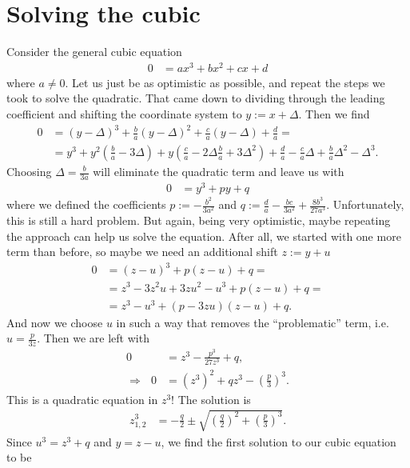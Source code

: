 \documentclass[english, parskip=full]{scrartcl}
\newcommand{\kla}{}
\begin{document}
\section{Solving the cubic}
Consider the general cubic equation
\begin{align}
0 &= ax^3+bx^2+cx+d
\end{align}
where $a\neq 0$.
Let us just be as optimistic as possible, and repeat the steps we took to solve the quadratic.
That came down to dividing through the leading coefficient and shifting the coordinate system to $y:=x+\Delta$.
Then we find
\begin{align}
0 &= \kla\left( y-\Delta \right)^3 + \frac{b}{a} \kla\left( y-\Delta \right)^2 + \frac{c}{a}\kla\left( y-\Delta \right) + \frac{d}{a} = \\
&= y^3 + y^2\kla\left( \frac{b}{a} - 3\Delta \right) + y\kla\left( \frac{c}{a} - 2\Delta\frac{b}{a} + 3\Delta^2 \right) +\frac{d}{a} - \frac{c}{a}\Delta + \frac{b}{a}\Delta^2 - \Delta^3.
\end{align}
Choosing $\Delta = \frac{b}{3a}$ will eliminate the quadratic term and leave us with
\begin{align}
0 &= y^3 + py+q
\end{align}
where we defined the coefficients $p := -\frac{b^2}{3a^2}$ and $q := \frac{d}{a} - \frac{bc}{3a^2} + \frac{8b^3}{27a^3}$.
Unfortunately, this is still a hard problem. 
But again, being very optimistic, maybe repeating the approach can help us solve the equation.
After all, we started with one more term than before, so maybe we need an additional shift $z := y + u$
\begin{align}
0 &= (z-u)^3 + p(z-u)+q = \\
&= z^3 - 3z^2u + 3zu^2 - u^3 + p(z-u) + q = \\
&= z^3 - u^3 + (p- 3zu)(z-u) + q.
\end{align}
And now we choose $u$ in such a way that removes the ``problematic'' term, i.e. $u = \frac{p}{3z}$.
Then we are left with
\begin{align}
0 &= z^3 - \frac{p^3}{27z^3} + q,\\
\Rightarrow\ \ \ 0 &= (z^3)^2 + qz^3 - \kla\left( \frac{p}{3} \right)^3.
\end{align}
This is a quadratic equation in $z^3$!
The solution is
\begin{align}
z_{1,2}^3 &= -\frac{q}{2} \pm \sqrt{\kla\left( \frac{q}{2} \right)^2 + \kla\left( \frac{p}{3} \right)^3}.
\end{align}
Since $u^3 = z^3 + q$ and $y=z-u$, we find the first solution to our cubic equation to be
\end{document}
